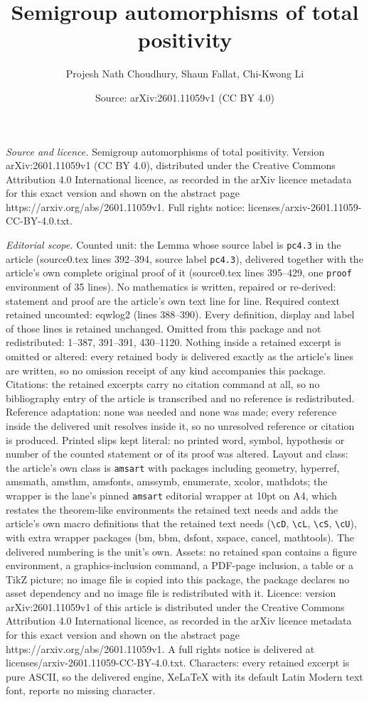 \documentclass[10pt,a4paper]{amsart}
\title[Semigroup automorphisms of total positivity]{Semigroup automorphisms of total positivity}
\author{Projesh Nath Choudhury, Shaun Fallat, Chi-Kwong Li}
\date{Source: arXiv:2601.11059v1 (CC BY 4.0)}
\begin{document}
\maketitle

\noindent\emph{Source and licence.} Semigroup automorphisms of total positivity. Version arXiv:2601.11059v1 (CC BY 4.0), distributed under the Creative Commons Attribution 4.0 International licence, as recorded in the arXiv licence metadata for this exact version and shown on the abstract page https://arxiv.org/abs/2601.11059v1. Full rights notice: licenses/arxiv-2601.11059-CC-BY-4.0.txt.\par\smallskip

\noindent\textit{Editorial scope.} Counted unit: the Lemma whose source label is \texttt{pc4.3} in the article (source0.tex lines 392--394, source label \texttt{pc4.3}), delivered together with the article's own complete original proof of it (source0.tex lines 395--429, one \texttt{proof} environment of 35 lines). No mathematics is written, repaired or re-derived: statement and proof are the article's own text line for line. Required context retained uncounted: eqwlog2 (lines 388--390). Every definition, display and label of those lines is retained unchanged. Omitted from this package and not redistributed: 1--387, 391--391, 430--1120. Nothing inside a retained excerpt is omitted or altered: every retained body is delivered exactly as the article's lines are written, so no omission receipt of any kind accompanies this package. Citations: the retained excerpts carry no citation command at all, so no bibliography entry of the article is transcribed and no reference is redistributed. Reference adaptation: none was needed and none was made; every reference inside the delivered unit resolves inside it, so no unresolved reference or citation is produced. Printed slips kept literal: no printed word, symbol, hypothesis or number of the counted statement or of its proof was altered. Layout and class: the article's own class is \texttt{amsart} with packages including geometry, hyperref, amsmath, amsthm, amsfonts, amssymb, enumerate, xcolor, mathdots; the wrapper is the lane's pinned \texttt{amsart} editorial wrapper at 10pt on A4, which restates the theorem-like environments the retained text needs and adds the article's own macro definitions that the retained text needs (\texttt{\textbackslash cD}, \texttt{\textbackslash cL}, \texttt{\textbackslash cS}, \texttt{\textbackslash cU}), with extra wrapper packages (bm, bbm, dsfont, xspace, cancel, mathtools). The delivered numbering is the unit's own. Assets: no retained span contains a figure environment, a graphics-inclusion command, a PDF-page inclusion, a table or a TikZ picture; no image file is copied into this package, the package declares no asset dependency and no image file is redistributed with it. Licence: version arXiv:2601.11059v1 of this article is distributed under the Creative Commons Attribution 4.0 International licence, as recorded in the arXiv licence metadata for this exact version and shown on the abstract page https://arxiv.org/abs/2601.11059v1. A full rights notice is delivered at licenses/arxiv-2601.11059-CC-BY-4.0.txt. Characters: every retained excerpt is pure ASCII, so the delivered engine, XeLaTeX with its default Latin Modern text font, reports no missing character.
\end{document}
